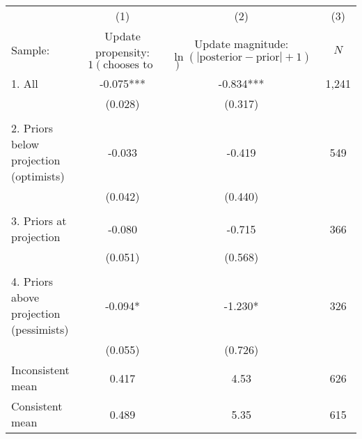 \begin{tabular}{l c c c}
  \hline
  \hline
 & (1) & (2) & (3) \\ 
  Sample: & \shortstack{Update propensity: \\
  $1(\text{chooses to update})$} & \shortstack{Update magnitude: \\ $\ln(|\text{posterior} -
  \text{prior}|+1)$} & $N$ \\ 
  \hline  
1. All & -0.075*** & -0.834*** & 1,241 \\
  & (0.028) & (0.317) \\
  \\
2. Priors below projection (optimists) & -0.033
       & -0.419 & 
 549 \\
  & (0.042) & (0.440) \\
  \\
3. Priors at projection & -0.080 & -0.715
          & 366 \\
  & (0.051) & (0.568) \\
  \\
4. Priors above projection (pessimists) & -0.094* & -1.230*
          & 326 \\
  & (0.055) & (0.726) \\
  \hline
  Inconsistent mean & 0.417 & 4.53
             & 626 \\
  Consistent mean & 0.489
       & 5.35
             & 615 \\
  \hline
  \hline
\end{tabular}

